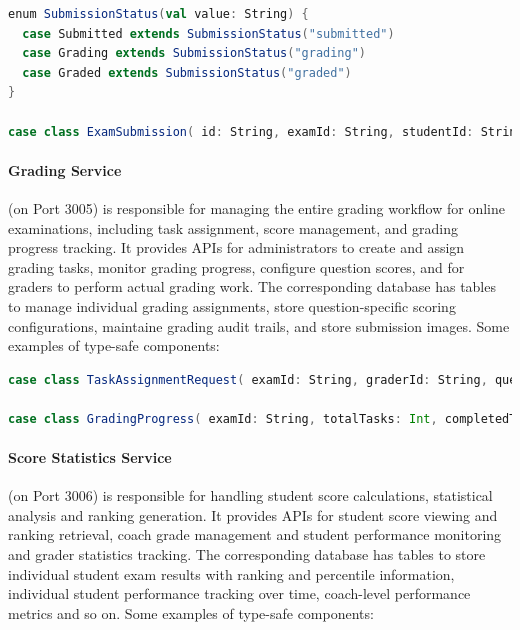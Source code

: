 \documentclass[12pt]{article}
\begin{document}
\begin{lstlisting}[language=Scala]
enum SubmissionStatus(val value: String) {
  case Submitted extends SubmissionStatus("submitted")
  case Grading extends SubmissionStatus("grading")
  case Graded extends SubmissionStatus("graded")
}

case class ExamSubmission( id: String, examId: String, studentId: String, studentUsername: String, studentName: Option[String] = None, answers: List[ExamAnswer], submittedAt: LocalDateTime, status: SubmissionStatus, totalScore: Option[Double] = None, maxScore: Option[Double] = None, gradedAt: Option[LocalDateTime] = None, gradedBy: Option[String] = None, feedback: Option[String] = None, submittedBy: Option[String] = None )
\end{lstlisting}

\paragraph{Grading Service} (on Port 3005) is responsible for managing the entire grading workflow for online examinations, including task assignment, score management, and grading progress tracking. It provides APIs for administrators to create and assign grading tasks, monitor grading progress, configure question scores, and for graders to perform actual grading work. The corresponding database has tables to manage individual grading assignments, store question-specific scoring configurations, maintaine grading audit trails, and store submission images. Some examples of type-safe components:

\begin{lstlisting}[language=Scala]
case class TaskAssignmentRequest( examId: String, graderId: String, questionIds: List[String] )

case class GradingProgress( examId: String, totalTasks: Int, completedTasks: Int, inProgressTasks: Int, pendingTasks: Int, completionPercentage: BigDecimal )
\end{lstlisting}

\paragraph{Score Statistics Service} (on Port 3006) is responsible for handling student score calculations, statistical analysis and ranking generation. It provides APIs for student score viewing and ranking retrieval, coach grade management and student performance monitoring and grader statistics tracking. The corresponding database has tables to store individual student exam results with ranking and percentile information, individual student performance tracking over time, coach-level performance metrics and so on. Some examples of type-safe components:
\end{document}
